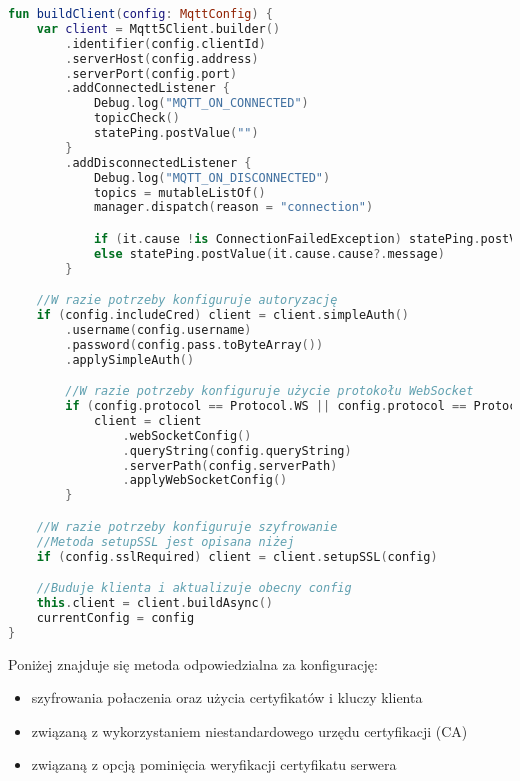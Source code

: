 \begin{lstlisting}[language=Kotlin]
fun buildClient(config: MqttConfig) {
    var client = Mqtt5Client.builder()
        .identifier(config.clientId)
        .serverHost(config.address)
        .serverPort(config.port)
        .addConnectedListener {
            Debug.log("MQTT_ON_CONNECTED")
            topicCheck()
            statePing.postValue("")
        }
        .addDisconnectedListener {
            Debug.log("MQTT_ON_DISCONNECTED")
            topics = mutableListOf()
            manager.dispatch(reason = "connection")

            if (it.cause !is ConnectionFailedException) statePing.postValue("")
            else statePing.postValue(it.cause.cause?.message)
        }

    //W razie potrzeby konfiguruje autoryzację
    if (config.includeCred) client = client.simpleAuth()
        .username(config.username)
        .password(config.pass.toByteArray())
        .applySimpleAuth()

        //W razie potrzeby konfiguruje użycie protokołu WebSocket
        if (config.protocol == Protocol.WS || config.protocol == Protocol.WSS) {
            client = client
                .webSocketConfig()
                .queryString(config.queryString)
                .serverPath(config.serverPath)
                .applyWebSocketConfig()
        }

    //W razie potrzeby konfiguruje szyfrowanie
    //Metoda setupSSL jest opisana niżej
    if (config.sslRequired) client = client.setupSSL(config)

    //Buduje klienta i aktualizuje obecny config
    this.client = client.buildAsync()
    currentConfig = config
}
\end{lstlisting}

\newpage

Poniżej znajduje się metoda odpowiedzialna za konfigurację:
\begin{itemize}[leftmargin=*]
    \item szyfrowania połaczenia oraz użycia certyfikatów i kluczy klienta
    \item związaną z wykorzystaniem niestandardowego urzędu certyfikacji (CA)
    \item związaną z opcją pominięcia weryfikacji certyfikatu serwera
\end{itemize}

